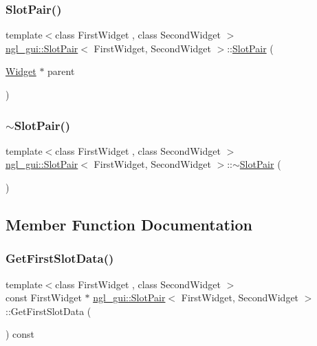 \subsubsection{\texorpdfstring{Slot\+Pair()}{SlotPair()}}
{\footnotesize\ttfamily template$<$class First\+Widget , class Second\+Widget $>$ \\
\mbox{\hyperlink{classngl__gui_1_1_slot_pair}{ngl\+\_\+gui\+::\+Slot\+Pair}}$<$ First\+Widget, Second\+Widget $>$\+::\mbox{\hyperlink{classngl__gui_1_1_slot_pair}{Slot\+Pair}} (\begin{DoxyParamCaption}\item[{\mbox{\hyperlink{classngl__gui_1_1_widget}{Widget}} $\ast$}]{parent }\end{DoxyParamCaption})\hspace{0.3cm}{\ttfamily [explicit]}}

\mbox{\label{classngl__gui_1_1_slot_pair_ae92ee1fe2988c034bee83f75c22d425c}} 
\subsubsection{\texorpdfstring{$\sim$\+Slot\+Pair()}{~SlotPair()}}
{\footnotesize\ttfamily template$<$class First\+Widget , class Second\+Widget $>$ \\
\mbox{\hyperlink{classngl__gui_1_1_slot_pair}{ngl\+\_\+gui\+::\+Slot\+Pair}}$<$ First\+Widget, Second\+Widget $>$\+::$\sim$\mbox{\hyperlink{classngl__gui_1_1_slot_pair}{Slot\+Pair}} (\begin{DoxyParamCaption}{ }\end{DoxyParamCaption})}



\subsection{Member Function Documentation}
\mbox{\label{classngl__gui_1_1_slot_pair_ac8ffede6a37fa6af0f6bd837779e6180}} 
\subsubsection{\texorpdfstring{Get\+First\+Slot\+Data()}{GetFirstSlotData()}\hspace{0.1cm}{\footnotesize\ttfamily [1/2]}}
{\footnotesize\ttfamily template$<$class First\+Widget , class Second\+Widget $>$ \\
const First\+Widget $\ast$ \mbox{\hyperlink{classngl__gui_1_1_slot_pair}{ngl\+\_\+gui\+::\+Slot\+Pair}}$<$ First\+Widget, Second\+Widget $>$\+::Get\+First\+Slot\+Data (\begin{DoxyParamCaption}{ }\end{DoxyParamCaption}) const}

